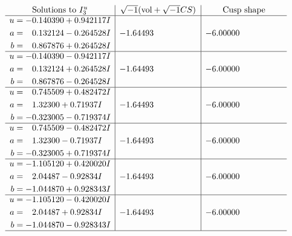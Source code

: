 \documentclass[1p]{elsarticle_modified}
\theoremstyle{definition}
\newcommand{\I}{\sqrt{-1}}
\begin{document}
$$\begin{array}{c|c|c}  
\text{Solutions to }I^u_{3}& \I (\text{vol} + \sqrt{-1}CS) & \text{Cusp shape}\\
 \hline 
\begin{aligned}
u &= -0.140390 + 0.942117 I \\
a &= \phantom{-}0.132124 - 0.264528 I \\
b &= \phantom{-}0.867876 + 0.264528 I\end{aligned}
 & -1.64493\phantom{ +0.000000I} & -6.00000\phantom{ +0.000000I} \\ \hline\begin{aligned}
u &= -0.140390 - 0.942117 I \\
a &= \phantom{-}0.132124 + 0.264528 I \\
b &= \phantom{-}0.867876 - 0.264528 I\end{aligned}
 & -1.64493\phantom{ +0.000000I} & -6.00000\phantom{ +0.000000I} \\ \hline\begin{aligned}
u &= \phantom{-}0.745509 + 0.482472 I \\
a &= \phantom{-}1.32300 + 0.71937 I \\
b &= -0.323005 - 0.719374 I\end{aligned}
 & -1.64493\phantom{ +0.000000I} & -6.00000\phantom{ +0.000000I} \\ \hline\begin{aligned}
u &= \phantom{-}0.745509 - 0.482472 I \\
a &= \phantom{-}1.32300 - 0.71937 I \\
b &= -0.323005 + 0.719374 I\end{aligned}
 & -1.64493\phantom{ +0.000000I} & -6.00000\phantom{ +0.000000I} \\ \hline\begin{aligned}
u &= -1.105120 + 0.420020 I \\
a &= \phantom{-}2.04487 - 0.92834 I \\
b &= -1.044870 + 0.928343 I\end{aligned}
 & -1.64493\phantom{ +0.000000I} & -6.00000\phantom{ +0.000000I} \\ \hline\begin{aligned}
u &= -1.105120 - 0.420020 I \\
a &= \phantom{-}2.04487 + 0.92834 I \\
b &= -1.044870 - 0.928343 I\end{aligned}
 & -1.64493\phantom{ +0.000000I} & -6.00000\phantom{ +0.000000I}\\
 \hline 
 \end{array}$$\newpage\newpage\renewcommand{\arraystretch}{1}
\end{document}
